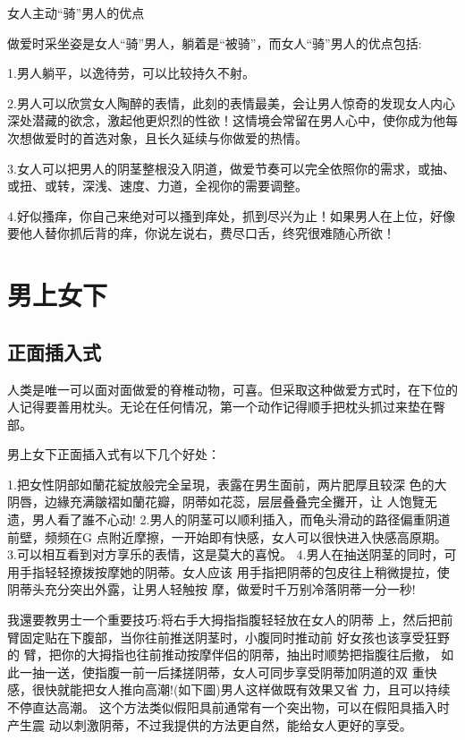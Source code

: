 \documentclass[12pt,UTF8]{ctexbook}
\begin{document}
女人主动“骑”男人的优点

做爱时采坐姿是女人“骑”男人，躺着是“被骑”，而女人“骑”男人的优点包括:

1.男人躺平，以逸待劳，可以比较持久不射。

2.男人可以欣赏女人陶醉的表情，此刻的表情最美，会让男人惊奇的发现女人内心深处潜藏的欲念，激起他更炽烈的性欲！这情境会常留在男人心中，使你成为他每次想做爱时的首选对象，且长久延续与你做爱的热情。

3.女人可以把男人的阴茎整根没入阴道，做爱节奏可以完全依照你的需求，或抽、或扭、或转，深浅、速度、力道，全视你的需要调整。

4.好似搔痒，你自己来绝对可以搔到痒处，抓到尽兴为止！如果男人在上位，好像要他人替你抓后背的痒，你说左说右，费尽口舌，终究很难随心所欲！

\section{男上女下}

\subsection{正面插入式}

人类是唯一可以面对面做爱的脊椎动物，可喜。但采取这种做爱方式时，在下位的人记得要善用枕头。无论在任何情况，第一个动作记得顺手把枕头抓过来垫在臀部。

男上女下正面插入式有以下几个好处：

1.把女性阴部如蘭花綻放般完全呈現，表露在男生面前，两片肥厚且较深
色的大阴唇，边緣充满皺褶如蘭花瓣，阴蒂如花蕊，层层叠叠完全攤开，让
人饱覽无遗，男人看了誰不心动!
2.男人的阴茎可以顺利插入，而龟头滑动的路径偏重阴道前壁，频频在G
点附近摩擦，一开始即有快感，女人可以很快进入快感高原期。
3.可以相互看到对方享乐的表情，这是莫大的喜悅。
4.男人在抽送阴茎的同时，可用手指轻轻撩拨按摩她的阴蒂。女人应该
用手指把阴蒂的包皮往上稍微提拉，使阴蒂头充分突出外露，让男人轻触按
摩，做爱时千万别冷落阴蒂一分一秒!

我還要教男士一个重要技巧:将右手大拇指指腹轻轻放在女人的阴蒂
上，然后把前臂固定贴在下腹部，当你往前推送阴茎时，小腹同时推动前
好女孩也该享受狂野的
臂，把你的大拇指也往前推动按摩伴侣的阴蒂，抽出时顺势把指腹往后撤，
如此一抽一送，使指腹一前一后揉搓阴蒂，女人可同步享受阴蒂加阴道的双
重快感，很快就能把女人推向高潮!(如下圖)男人这样做既有效果又省
力，且可以持续不停直达高潮。
这个方法类似假阳具前通常有一个突出物，可以在假阳具插入时产生震
动以刺激阴蒂，不过我提供的方法更自然，能给女人更好的享受。
\end{document}
